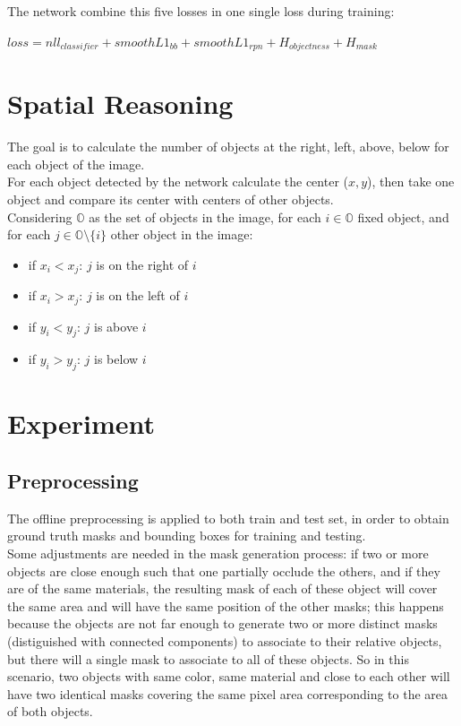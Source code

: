 \documentclass[10pt,twocolumn,letterpaper]{article}
\begin{document}
  The network combine this five losses in one single loss during training:
  \begin{center}
    $ loss = nll_{classifier} + smoothL1_{bb} + smoothL1_{rpn} +
    H_{objectness} + H_{mask}  $
  \end{center}



\section{Spatial Reasoning}
  The goal is to calculate the number of objects
  at the right, left, above, below for each object of 
  the image. 
  \\For each object detected by the network calculate the center ($x, y$),
  then take one object and compare its center with centers of other objects.
  \\Considering $\mathbb{O} $ as the set of objects in the image,
  for each $i \in \mathbb{O}$ fixed object,
    and for each $j \in \mathbb{O}\setminus\{i\} $ other object in the image:
  \begin{itemize}
    \item if $x_i < x_j $: $j$ is on the right of $i$ 
    \item if $x_i > x_j $: $j$ is on the left of $i$
    \item if $y_i < y_j $: $j$ is above $i$
    \item if $y_i > y_j $: $j$ is below $i$
  \end{itemize}

\section{Experiment}
\subsection*{Preprocessing}
  The offline preprocessing is applied to both train and test set,
  in order to obtain ground truth masks and bounding boxes for
  training and testing.
  \\Some adjustments are needed in the mask generation process:
   if two or more objects are close 
  enough such that one partially occlude the others, and if they are of the same
  materials, the resulting mask of each of these object will cover the same area
  and will have the same position of the other masks;
  this  happens because the objects are not far enough to generate two or more distinct 
  masks (distiguished with connected components) to associate to their relative objects, but there will a single mask to associate
  to all of these objects. So in this scenario, two objects with
  same color, same material and close to each other will have two identical masks covering
  the same pixel area corresponding to the area of both objects.
\end{document}
